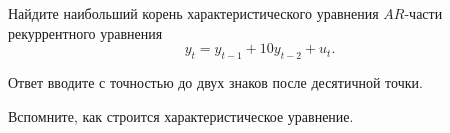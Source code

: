 
\begin{question}
Найдите наибольший корень характеристического уравнения \(AR\)-части рекуррентного уравнения
\[
y_t = y_{t-1} + 10 y_{t-2} + u_t.
\]

Ответ вводите с точностью до двух знаков после десятичной точки.
\end{question}

\begin{solution}
Вспомните, как строится характеристическое уравнение.
\end{solution}

